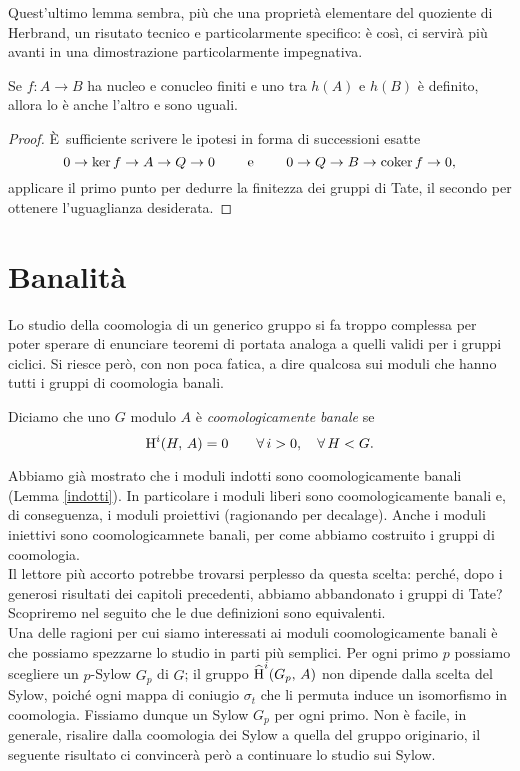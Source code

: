Quest'ultimo lemma sembra, più che una proprietà elementare del quoziente di Herbrand, un risutato tecnico e particolarmente specifico: è così, ci servirà più avanti in una dimostrazione particolarmente impegnativa.

\begin{lemma}\label{Herb3}
	Se $ f \colon A \to B $ ha nucleo e conucleo finiti e uno tra $ h(A) $ e $h(B) $ è definito, allora lo è anche l'altro e sono uguali.
\end{lemma}

\begin{proof}
	È\ sufficiente scrivere le ipotesi in forma di successioni esatte
	\[ 0 \to \ker f \to A \to Q \to 0 \qquad\text{ e } \qquad 0 \to Q \to B \to \operatorname{coker} f \to 0, \]
	applicare il primo punto per dedurre la finitezza dei gruppi di Tate, il secondo per ottenere l'uguaglianza desiderata.
\end{proof}



\section{Banalità}
Lo studio della coomologia di un generico gruppo si fa troppo complessa per poter sperare di enunciare teoremi di portata analoga a quelli validi per i gruppi ciclici. Si riesce però, con non poca fatica, a dire qualcosa sui moduli che hanno tutti i gruppi di coomologia banali.

\begin{definition}
	Diciamo che uno $ G $ modulo $ A $ è \emph{coomologicamente banale} se
	$$  \operatorname{H}^i(H, \, A) = 0 \qquad \forall \, i > 0, \quad  \forall \, H < G.  $$
\end{definition}


Abbiamo già mostrato che i moduli indotti sono coomologicamente banali (Lemma \ref{indotti}). In particolare i moduli liberi sono coomologicamente banali e, di conseguenza, i moduli proiettivi (ragionando per decalage). Anche i moduli iniettivi sono coomologicamnete banali, per come abbiamo costruito i gruppi di coomologia. \\

Il lettore più accorto potrebbe trovarsi perplesso da questa scelta: perché, dopo i generosi risultati dei capitoli precedenti, abbiamo abbandonato i gruppi di Tate? Scopriremo nel seguito che le due definizioni sono equivalenti. \\

Una delle ragioni per cui siamo interessati ai moduli coomologicamente banali è che possiamo spezzarne lo studio in parti più semplici. Per ogni primo $ p $ possiamo scegliere un $ p $-Sylow $ G_p $ di $ G $; il gruppo $ \operatorname{\widehat{H}}^i(G_p, \, A) $ non dipende dalla scelta del Sylow, poiché ogni mappa di coniugio $ \sigma_t $ che li permuta induce un isomorfismo in coomologia. Fissiamo dunque un Sylow $ G_p $ per ogni primo. Non è facile, in generale, risalire dalla coomologia dei Sylow a quella del gruppo originario, il seguente risultato ci convincerà però a continuare lo studio sui Sylow.

